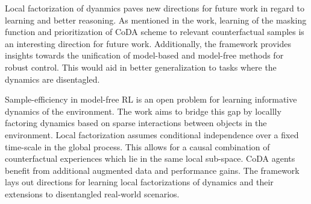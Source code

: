 \documentclass[11pt,letterpaper]{article}
\begin{document}
Local factorization of dyanmics paves new directions for future work in regard to learning and better reasoning. As mentioned in the work, learning of the masking function and prioritization of CoDA scheme to relevant counterfactual samples is an interesting direction for future work. Additionally, the framework provides insights towards the unification of model-based and model-free methods for robust control. This would aid in better generalization to tasks where the dynamics are disentagled. 

Sample-efficiency in model-free RL is an open problem for learning informative dynamics of the environment. The work aims to bridge this gap by locallly factoring dynamics based on sparse interactions between objects in the environment. Local factorization assumes conditional independence over a fixed time-scale in the global process. This allows for a causal combination of counterfactual experiences which lie in the same local sub-space. CoDA agents benefit from additional augmented data and performance gains. The framework lays out directions for learning local factorizations of dynamics and their extensions to disentangled real-world scenarios. 
\end{document}
